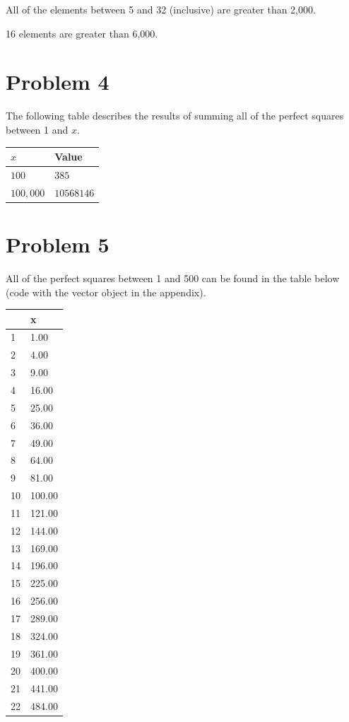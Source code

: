 \documentclass{amsart}
\begin{document}
All of the elements between 5 and 32 (inclusive) are greater than 2,000.

16 elements are greater than 6,000.

\section{Problem 4}
The following table describes the results of summing all of the perfect
squares between 1 and $x$.
\begin{table}[H]
\centering
\begin{tabular}{ll}
  \hline
    $x$ & Value \\
  \hline
  $100$ & $385$ \\
  $100,000$ & $10568146$ \\
   \hline
\end{tabular}
\end{table}

\section{Problem 5}
All of the perfect squares between 1 and 500 can be found in the table below
(code with the vector object in the appendix).
\begin{table}[H]
\centering
\begin{tabular}{ll}
  \hline
 & x \\
  \hline
1 & 1.00 \\
  2 & 4.00 \\
  3 & 9.00 \\
  4 & 16.00 \\
  5 & 25.00 \\
  6 & 36.00 \\
  7 & 49.00 \\
  8 & 64.00 \\
  9 & 81.00 \\
  10 & 100.00 \\
  11 & 121.00 \\
  12 & 144.00 \\
  13 & 169.00 \\
  14 & 196.00 \\
  15 & 225.00 \\
  16 & 256.00 \\
  17 & 289.00 \\
  18 & 324.00 \\
  19 & 361.00 \\
  20 & 400.00 \\
  21 & 441.00 \\
  22 & 484.00 \\
   \hline
\end{tabular}
\end{table}
\end{document}
